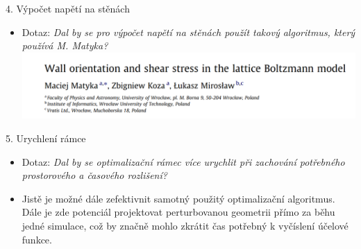 \documentclass[aspectratio=169,xcolor=dvipsnames]{beamer}
\begin{document}
\begin{frame}{4. Výpočet napětí na stěnách}
	\begin{itemize}
		\item Dotaz: \textit{Dal by se pro výpočet napětí na stěnách použít takový algoritmus, který používá M. Matyka?}\\[8pt]
		\includegraphics[width=0.99\linewidth, trim={0 0 0 0}, clip]{Images/dotaz2.png}
	\end{itemize}
\end{frame}
\begin{frame}{5. Urychlení rámce}
	\begin{itemize}
		\item Dotaz: \textit{Dal by se optimalizační rámec více urychlit při zachování potřebného prostorového a časového rozlišení?}\\[8pt]
		\item Jistě je možné dále zefektivnit samotný  použitý optimalizační algoritmus. Dále je zde potenciál projektovat perturbovanou geometrii přímo za běhu jedné simulace, což by značně mohlo zkrátit čas potřebný k vyčíslení účelové funkce.
	\end{itemize}
\end{frame}
\end{document}
